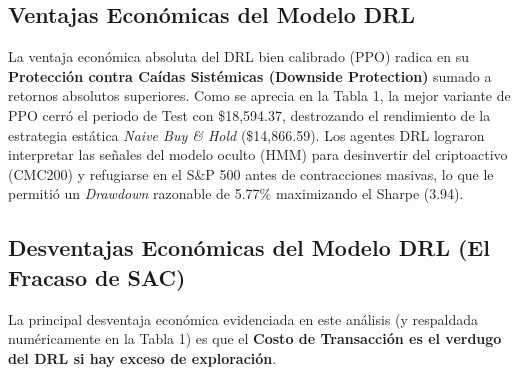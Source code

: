 \documentclass[12pt]{article}
\begin{document}
\subsection{Ventajas Económicas del Modelo DRL}
La ventaja económica absoluta del DRL bien calibrado (PPO) radica en su \textbf{Protección contra Caídas Sistémicas (Downside Protection)} sumado a retornos absolutos superiores. 
Como se aprecia en la Tabla 1, la mejor variante de PPO cerró el periodo de Test con \$18,594.37, destrozando el rendimiento de la estrategia estática \textit{Naive Buy \& Hold} (\$14,866.59). Los agentes DRL lograron interpretar las señales del modelo oculto (HMM) para desinvertir del criptoactivo (CMC200) y refugiarse en el S\&P 500 antes de contracciones masivas, lo que le permitió un \textit{Drawdown} razonable de 5.77\% maximizando el Sharpe (3.94).

\begin{table}[H]
\centering
{}
\caption{Contraste Económico Directo: PPO vs SAC vs Estrategias Pasivas.}
\end{table}

\subsection{Desventajas Económicas del Modelo DRL (El Fracaso de SAC)}
La principal desventaja económica evidenciada en este análisis (y respaldada numéricamente en la Tabla 1) es que el \textbf{Costo de Transacción es el verdugo del DRL si hay exceso de exploración}. 
\end{document}
